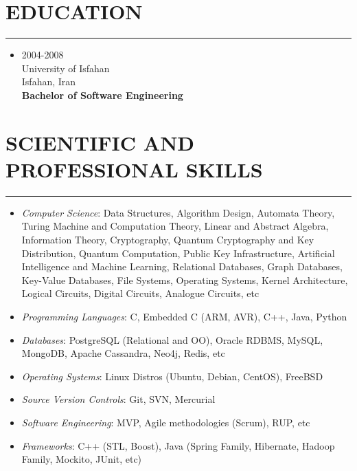 \documentclass[10pt,a4paper]{article}
\begin{document}

\section{EDUCATION}
\noindent \rule {3.0cm}{0.4pt}
  \begin{itemize}
    \item \small {2004-2008 \\
                  University of Isfahan \\
                  Isfahan, Iran \\
                  \textbf{Bachelor of Software Engineering}}
  \end{itemize}



\section{SCIENTIFIC AND PROFESSIONAL SKILLS}
\noindent \rule {10.0cm}{0.4pt}
\begin{itemize}
  \setlength{\rightskip}{2cm}
  \setlength\itemsep{0em}
  \item \small \textit {Computer Science}:
  Data Structures, Algorithm Design, Automata Theory, Turing Machine and Computation Theory, Linear and Abstract Algebra, Information Theory, Cryptography, Quantum Cryptography and Key Distribution, Quantum Computation, Public Key Infrastructure, Artificial Intelligence and Machine Learning,  Relational Databases, Graph Databases, Key-Value Databases, File Systems, Operating Systems, Kernel Architecture, Logical Circuits, Digital Circuits, Analogue Circuits, etc
  \item \small \textit {Programming Languages}: C, Embedded C (ARM, AVR), C++, Java, Python
  \item \small \textit {Databases}: PostgreSQL (Relational and OO), Oracle RDBMS, MySQL, MongoDB, Apache Cassandra, Neo4j, Redis, etc
  \item \small \textit {Operating Systems}: Linux Distros (Ubuntu, Debian, CentOS), FreeBSD
  \item \small \textit {Source Version Controls}: Git, SVN, Mercurial
  \item \small \textit {Software Engineering}: MVP, Agile methodologies (Scrum), RUP, etc
  \item \small \textit {Frameworks}: C++ (STL, Boost), Java (Spring Family, Hibernate, Hadoop Family, Mockito, JUnit, etc)
\end{itemize}
\end{document}
